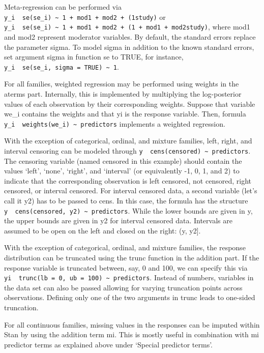 \documentclass[]{book}
\begin{document}
Meta-regression can be performed via
\texttt{y\_i\ \textbar{}\ se(se\_i)\ \textasciitilde{}\ 1\ +\ mod1\ +\ mod2\ +\ (1\textbar{}study)}
or
\texttt{y\_i\ \textbar{}\ se(se\_i)\ \textasciitilde{}\ 1\ +\ mod1\ +\ mod2\ +\ (1\ +\ mod1\ +\ mod2\textbar{}study)},
where mod1 and mod2 represent moderator variables. By default, the
standard errors replace the parameter sigma. To model sigma in addition
to the known standard errors, set argument sigma in function se to TRUE,
for instance,
\texttt{y\_i\ \textbar{}\ se(se\_i,\ sigma\ =\ TRUE)\ \textasciitilde{}\ 1}.

For all families, weighted regression may be performed using weights in
the aterms part. Internally, this is implemented by multiplying the
log-posterior values of each observation by their corresponding weights.
Suppose that variable we\_i contains the weights and that yi is the
response variable. Then, formula
\texttt{y\_i\ \textbar{}\ weights(we\_i)\ \textasciitilde{}\ predictors}
implements a weighted regression.

With the exception of categorical, ordinal, and mixture families, left,
right, and interval censoring can be modeled through
\texttt{y\ \textbar{}\ cens(censored)\ \textasciitilde{}\ predictors}.
The censoring variable (named censored in this example) should contain
the values `left', `none', `right', and `interval' (or equivalently -1,
0, 1, and 2) to indicate that the corresponding observation is left
censored, not censored, right censored, or interval censored. For
interval censored data, a second variable (let's call it y2) has to be
passed to cens. In this case, the formula has the structure
\texttt{y\ \textbar{}\ cens(censored,\ y2)\ \textasciitilde{}\ predictors}.
While the lower bounds are given in y, the upper bounds are given in y2
for interval censored data. Intervals are assumed to be open on the left
and closed on the right: (y, y2{]}.

With the exception of categorical, ordinal, and mixture families, the
response distribution can be truncated using the trunc function in the
addition part. If the response variable is truncated between, say, 0 and
100, we can specify this via
\texttt{yi\ \textbar{}\ trunc(lb\ =\ 0,\ ub\ =\ 100)\ \textasciitilde{}\ predictors}.
Instead of numbers, variables in the data set can also be passed
allowing for varying truncation points across observations. Defining
only one of the two arguments in trunc leads to one-sided truncation.

For all continuous families, missing values in the responses can be
imputed within Stan by using the addition term mi. This is mostly useful
in combination with mi predictor terms as explained above under `Special
predictor terms'.
\end{document}
